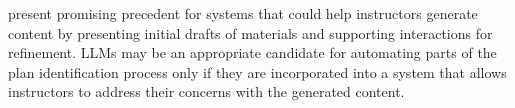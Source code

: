  present promising precedent for systems that could help instructors generate content by presenting initial drafts of materials and supporting interactions for refinement.  LLMs may be an appropriate candidate for automating parts of the plan identification process only if they are incorporated into a system that allows instructors to address their concerns with the generated content. 




